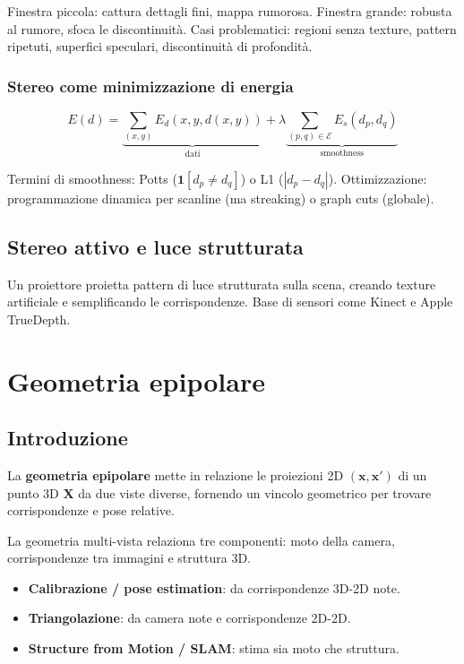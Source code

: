 \documentclass[12pt, a4paper]{report}
\begin{document}
\begin{notebox}
Finestra piccola: cattura dettagli fini, mappa rumorosa.
Finestra grande: robusta al rumore, sfoca le discontinuità.
Casi problematici: regioni senza texture, pattern ripetuti, superfici
speculari, discontinuità di profondità.
\end{notebox}

\subsection{Stereo come minimizzazione di energia}

\[
  E(d)=\underbrace{\sum_{(x,y)}E_d(x,y,d(x,y))}_{\text{dati}}+
       \lambda\underbrace{\sum_{(p,q)\in\mathcal{E}}E_s(d_p,d_q)}_{\text{smoothness}}
\]

Termini di smoothness: Potts ($\mathbf{1}[d_p\neq d_q]$) o L1 ($|d_p-d_q|$).
Ottimizzazione: programmazione dinamica per scanline (ma streaking) o graph cuts
(globale).

\section{Stereo attivo e luce strutturata}

Un proiettore proietta pattern di luce strutturata sulla scena, creando texture
artificiale e semplificando le corrispondenze. Base di sensori come Kinect e
Apple TrueDepth.

\chapter{Geometria epipolare}

\section{Introduzione}

\begin{defbox}
La \textbf{geometria epipolare} mette in relazione le proiezioni 2D
$(\mathbf{x},\mathbf{x}')$ di un punto 3D $\mathbf{X}$ da due viste diverse,
fornendo un vincolo geometrico per trovare corrispondenze e pose relative.
\end{defbox}

La geometria multi-vista relaziona tre componenti: moto della camera,
corrispondenze tra immagini e struttura 3D.
\begin{itemize}
  \item \textbf{Calibrazione / pose estimation}: da corrispondenze 3D-2D note.
  \item \textbf{Triangolazione}: da camera note e corrispondenze 2D-2D.
  \item \textbf{Structure from Motion / SLAM}: stima sia moto che struttura.
\end{itemize}
\end{document}

